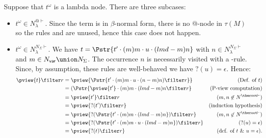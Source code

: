 Suppose that $t^\omega$ is a lambda node. There are three subcases:
\begin{itemize}
\item $t^\omega \in N^{@\vdash}_\lambda$. Since the term is in $\beta$-normal form, there is no
    @-node in $\tau(M)$ so the rules  and
     are unused, hence this case does not happen.

\item $t^\omega \in N^{N_\Sigma\vdash}_\lambda$. We have $t = \Pstr{t' \cdot (m){m} \cdot  u \cdot (lmd-m){n}}$ with $n\in N^{N_\Sigma
    \vdash}_\lambda$ and $m \in N_{\sf var} \union N_\Sigma$.
    The occurrence $n$ is necessarily visited with a
    -rule. Since, by assumption, these rules
    are well-behaved we have $?(u) = \epsilon$. Hence:
        \begin{align*}
        \pview{t} \filter  r
        &= \pview{\Pstr{t' \cdot (m){m} \cdot u \cdot (n-m){n}) \filter  r}}  & (\mbox{Def. of $t$})\\
        &= (\Pstr{\pview{t'} \cdot (m){m} \cdot (lmd-m){n} \filter  r} & (\mbox{P-view computation}) \\
        &= \pview{t'} \filter  r                & (m, n \not\in N^{\theroot \vdash}) \\
        &= \pview{?(t') \filter  r }               & \mbox{(induction hypothesis)} \\
        &= \pview{ ?(\Pstr{t' \cdot (m){m} \cdot (lmd-m){n}}) \filter r }
        & (m, n \not\in N^{\theroot \vdash}) \\
        &= \pview{ ?(\Pstr{t' \cdot (m){m} \cdot u \cdot (lmd-m){n}}) \filter r }
        & (?(u)=\epsilon) \\
        &= \pview{ ?(t) \filter r }                & \mbox{(def. of $t$ \& $u = \epsilon$).}
        \end{align*}


\end{itemize}
